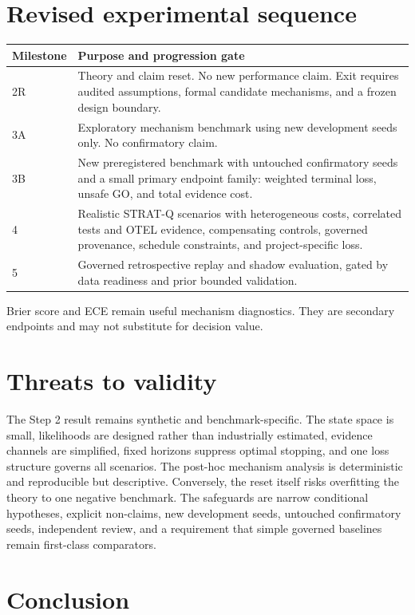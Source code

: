 \documentclass[11pt,a4paper]{article}
\begin{document}
\section{Revised experimental sequence}

\begin{longtable}{p{}p{}}
\toprule
Milestone & Purpose and progression gate \\
\midrule
2R & Theory and claim reset. No new performance claim. Exit requires audited assumptions, formal candidate mechanisms, and a frozen design boundary. \\
3A & Exploratory mechanism benchmark using new development seeds only. No confirmatory claim. \\
3B & New preregistered benchmark with untouched confirmatory seeds and a small primary endpoint family: weighted terminal loss, unsafe GO, and total evidence cost. \\
4 & Realistic STRAT-Q scenarios with heterogeneous costs, correlated tests and OTEL evidence, compensating controls, governed provenance, schedule constraints, and project-specific loss. \\
5 & Governed retrospective replay and shadow evaluation, gated by data readiness and prior bounded validation. \\
\bottomrule
\end{longtable}

Brier score and ECE remain useful mechanism diagnostics. They are secondary endpoints and may not substitute for decision value.

\section{Threats to validity}

The Step 2 result remains synthetic and benchmark-specific. The state space is small, likelihoods are designed rather than industrially estimated, evidence channels are simplified, fixed horizons suppress optimal stopping, and one loss structure governs all scenarios. The post-hoc mechanism analysis is deterministic and reproducible but descriptive. Conversely, the reset itself risks overfitting the theory to one negative benchmark. The safeguards are narrow conditional hypotheses, explicit non-claims, new development seeds, untouched confirmatory seeds, independent review, and a requirement that simple governed baselines remain first-class comparators.

\section{Conclusion}
\end{document}
